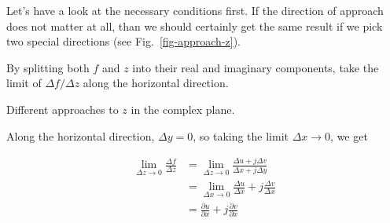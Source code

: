 Let's have a look at the necessary conditions first. If the direction of approach does not matter at all, than we should certainly get the same result if we pick two special directions (see Fig.~\ref{fig-approach-z}).

\begin{cue}
 By splitting both $f$ and $z$ into their real and imaginary components, take the limit of $\Delta f / \Delta z$ along the horizontal direction.
\end{cue}

\begin{marginfigure}
\caption{Different approaches to $z$ in the complex plane.}
\label{fig-approach-z}
\end{marginfigure}

Along the horizontal direction, $\Delta y = 0$, so taking the limit $\Delta x \to 0$, we get

\begin{align}
\lim_{\Delta z \to 0} \frac{\Delta f}{\Delta z}
& = \lim_{\Delta z \to 0} \frac{\Delta u + j \Delta v}{\Delta x + j \Delta y}
\nonumber \\
& = \lim_{\Delta x \to 0} \frac{\Delta u}{\Delta x} + j \frac{\Delta v}{\Delta
x} \nonumber \\
& = \frac{\partial u}{\partial x} + j \frac{\partial v}{\partial
x}\label{eq-deriv-dx}
\end{align} 

